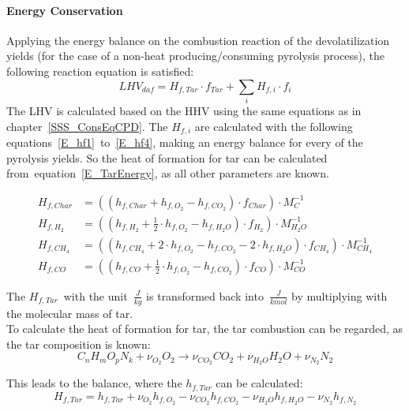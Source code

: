 \paragraph{Energy Conservation}

Applying the energy balance on the combustion reaction of the devolatilization yields (for the case of a non-heat producing/consuming pyrolysis process), the following reaction equation is satisfied:
\begin{equation} \label{E_TarEnergy}
 LHV_{daf}=H_{f,Tar} \cdot f_{Tar} + \sum_i H_{f,i} \cdot f_{i}
\end{equation}
The LHV is calculated based on the HHV using the same equations as in chapter~\ref{SSS_ConsEqCPD}. The $H_{f,i}$ are calculated with the following equations~\ref{E_hf1}~to~\ref{E_hf4}, making an energy balance for every of the pyrolysis yields.
So the heat of formation for tar can be calculated from~equation~\ref{E_TarEnergy}, as all other parameters are known.

\begin{align}
\label{E_hf1}
 H_{f,Char}&=\left( (h_{f,Char}+h_{f,O_2}-h_{f,CO_2}) \cdot f_{Char} \right) \cdot M_C^{-1} \\
\label{E_hf2}
 H_{f,H_2}&=\left( (h_{f,H_2}+ \frac{1}{2} \cdot h_{f,O_2} - h_{f,H_2O}) \cdot f_{H_2} \right) \cdot M_{H_2O}^{-1} \\
\label{E_hf3}
 H_{f,CH_4}&=\left( (h_{f,CH_4}+ 2 \cdot h_{f,O_2}-h_{f,CO_2}-2 \cdot h_{f,H_2O}) \cdot f_{CH_4} \right) \cdot M_{CH_4}^{-1} \\
\label{E_hf4}
 H_{f,CO}&=\left( (h_{f,CO}+ \frac{1}{2} \cdot h_{f,O_2}-h_{f,CO_2}) \cdot f_{CO} \right) \cdot M_{CO}^{-1}
\end{align}

The $H_{f,Tar}$~with the unit~$\frac{J}{kg}$ is transformed back into~$\frac{J}{kmol}$ by multiplying with the molecular mass of tar.\\
To calculate the heat of formation for tar, the tar combustion can be regarded, as the tar composition is known:
\begin{equation}
 C_nH_mO_pN_k + \nu_{O_2} O_2 \rightarrow  \nu_{CO_2} CO_2 + \nu_{H_2O} H_2O + \nu_{N_2} N_2
\end{equation}

This leads to the balance, where the $h_{f,Tar}$ can be calculated:
\begin{equation}
 H_{f,Tar} = h_{f,Tar} + \nu_{O_2} h_{f,O_2} - \nu_{CO_2} h_{f,CO_2} - \nu_{H_2O} h_{f,H_2O} -\nu_{N_2} h_{f,N_2} 
\end{equation}

